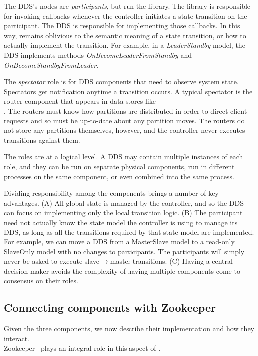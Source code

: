The DDS's nodes are \emph{participants}, but run the \helix library.  The
library is responsible for invoking callbacks whenever the controller initiates
a state transition on the participant.  The DDS is responsible for implementing
those callbacks.  In this way, \helix remains oblivious to the semantic meaning
of a state transition, or how to actually implement the transition.  For
example, in a \emph{LeaderStandby} model, the DDS implements methods
\emph{OnBecomeLeaderFromStandby} and \emph{OnBecomeStandbyFromLeader}.

The \emph{spectator} role is for DDS components that need to observe system
state.  Spectators get notification anytime a transition occurs.  A typical
spectator is the router component that appears in data stores like \\ \ES.  The
routers must know how partitions are distributed in order to direct client
requests and so must be up-to-date about any partition moves.  The routers do
not store any partitions themselves, however, and the controller never executes
transitions against them.

The roles are at a logical level.  A DDS may contain multiple instances of each
role, and they can be run on separate physical components, run in different
processes on the same component, or even combined into the same process.
 
Dividing responsibility among the components brings a number of key
advantages.  (A) All global state is managed by the controller, and so the DDS can
focus on implementing only the local transition logic.  (B) The participant need
not actually know the state model the controller is using to manage its DDS, as
long as all the transitions required by that state model are implemented.  
For example, we can move a DDS from a MasterSlave model to a read-only SlaveOnly
model with no changes to participants.  The participants will simply never
be asked to execute slave$\rightarrow$master transitions.  (C) Having a
central decision maker avoids the complexity of having multiple components come
to consensus on their roles.    

\subsection{Connecting components with Zookeeper}

Given the three \helix components, we now describe their implementation and how
they interact. \\ Zookeeper~\cite{zookeeper} plays an integral role in this aspect
of \helix.

